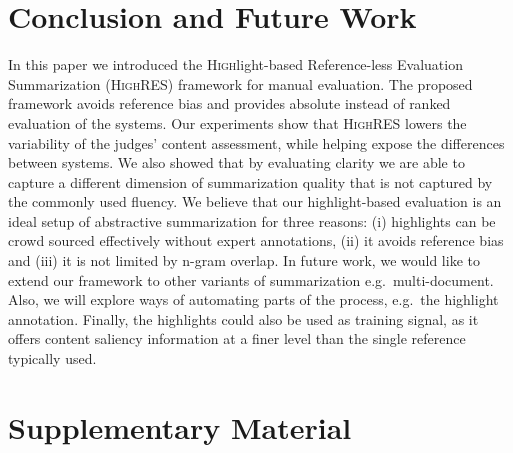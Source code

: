 \documentclass[11pt,a4paper]{article}
\newcommand\shashi[1]{{\textcolor{blue}{shashi: #1}}}
\newcommand\highres{\textsc{HighRES}}
\begin{document}
\section{Conclusion and Future Work}
In this paper we introduced the \textsc{High}light-based \textsc{R}eference-less \textsc{E}valuation \textsc{S}ummarization (\highres) framework for manual evaluation.
The proposed framework avoids reference  bias
and provides absolute instead of ranked evaluation of the systems. Our experiments show that \highres{}  lowers the variability of the judges' content assessment, while helping expose the differences between systems. We also showed that by evaluating clarity we are able to capture a different dimension of summarization quality that is not captured by the commonly used fluency. 
We believe that our highlight-based evaluation is an ideal setup of abstractive summarization for three reasons: (i) highlights can be crowd sourced effectively without expert annotations, (ii) it avoids reference bias and (iii) it is not limited by n-gram overlap.
In future work, we would like to extend our framework to other variants of summarization e.g.\  multi-document. Also, we will explore ways of automating parts of the process, e.g.\ the highlight annotation. Finally, the highlights could also be used as training signal, as it offers content saliency information at a finer level than the single reference typically used.





\onecolumn
\newpage
\setcounter{section}{0}
\setcounter{figure}{0}
\setcounter{table}{0}
\section*{Supplementary Material}
\end{document}

